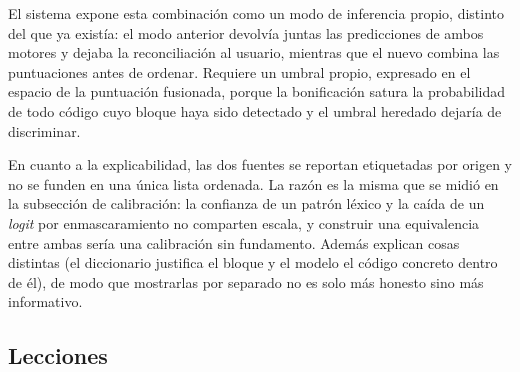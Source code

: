El sistema expone esta combinación como un modo de inferencia propio, distinto del que ya existía: el modo anterior devolvía juntas las predicciones de ambos motores y dejaba la reconciliación al usuario, mientras que el nuevo combina las puntuaciones antes de ordenar. Requiere un umbral propio, expresado en el espacio de la puntuación fusionada, porque la bonificación satura la probabilidad de todo código cuyo bloque haya sido detectado y el umbral heredado dejaría de discriminar.

En cuanto a la explicabilidad, las dos fuentes se reportan etiquetadas por origen y no se funden en una única lista ordenada. La razón es la misma que se midió en la subsección de calibración: la confianza de un patrón léxico y la caída de un \emph{logit} por enmascaramiento no comparten escala, y construir una equivalencia entre ambas sería una calibración sin fundamento. Además explican cosas distintas (el diccionario justifica el bloque y el modelo el código concreto dentro de él), de modo que mostrarlas por separado no es solo más honesto sino más informativo.

\subsection{Lecciones}

